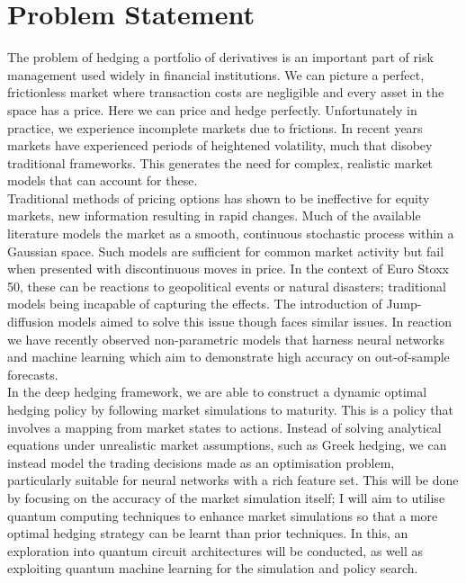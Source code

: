 \documentclass[12pt]{article}
\numberwithin{equation}{section}
\begin{document}
\section{Problem Statement}
The problem of hedging a portfolio of derivatives is an important part of 
risk management used widely in financial institutions. We can picture a perfect, 
frictionless market where transaction costs are negligible and every asset in 
the space has a price. Here we can price and hedge perfectly. Unfortunately in 
practice, we experience incomplete markets due to frictions. In recent years 
markets have experienced periods of heightened volatility, much that disobey 
traditional frameworks. This generates the need for complex, realistic market 
models that can account for these.\\ 
Traditional methods of pricing options has shown to be ineffective for equity 
markets, new information resulting in rapid changes. Much of the available 
literature models the market as a smooth, continuous stochastic process within 
a Gaussian space. Such models are sufficient for common market activity but fail 
when presented with discontinuous moves in price. In the context of Euro Stoxx 50, 
these can be reactions to geopolitical events or natural disasters; traditional
models being incapable of capturing the effects. The introduction of Jump-diffusion 
models aimed to solve this issue though faces similar issues. In reaction we have 
recently observed non-parametric models that harness neural networks and machine 
learning which aim to demonstrate high accuracy on out-of-sample forecasts.
\\
In the deep hedging framework, we are able to construct a dynamic optimal hedging 
policy by following market simulations to maturity. This is a policy that involves 
a mapping from market states to actions. Instead of solving analytical equations 
under unrealistic market assumptions, such as Greek hedging, we can instead model
the trading decisions made as an optimisation problem, particularly suitable for 
neural networks with a rich feature set. This will be done by focusing on the 
accuracy of the market simulation itself; I will aim to utilise quantum computing 
techniques to enhance market simulations so that a more optimal hedging strategy 
can be learnt than prior techniques. In this, an exploration into quantum circuit 
architectures will be conducted, as well as exploiting quantum machine learning 
for the simulation and policy search.

\clearpage
\end{document}
